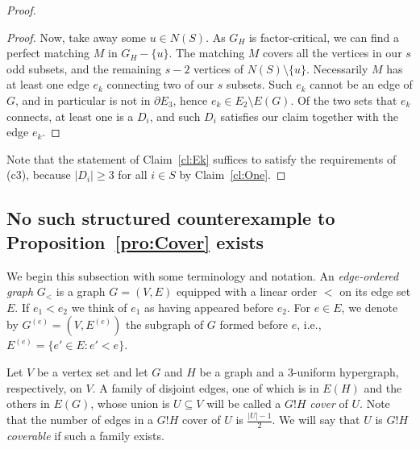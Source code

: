 \documentclass{article}
\theoremstyle{definition}
\begin{document}
\begin{proof}
\begin{proof}
Now, take away some $u \in N(S)$. As $G_H$ is factor-critical, we can find a perfect matching $M$ in $G_H - \{u\}$. The matching $M$ covers all the vertices in our $s$ odd subsets, and the remaining $s-2$ vertices of $N(S) \setminus \{u\}$. Necessarily $M$ has at least one edge $e_k$ connecting two of our $s$ subsets. Such $e_k$ cannot be an edge of $G$, and in particular is not in $\partial E_3$, hence $e_k \in E_2 \setminus E(G)$. Of the two sets that $e_k$ connects, at least one is a $D_i$, and such $D_i$ satisfies our claim together with the edge $e_k$.
\end{proof}

Note that the statement of Claim~\ref{cl:Ek} suffices to satisfy the requirements of (c3), because $|D_i| \ge 3$ for all $i \in S$ by Claim~\ref{cl:One}.
\end{proof}

\subsection{No such structured counterexample to Proposition~\ref{pro:Cover} exists}
We begin this subsection with some terminology and notation. An \emph{edge-ordered graph} $G_<$ is a graph $G = (V, E)$ equipped with a linear order $<$ on its edge set $E$. If $e_1 < e_2$ we think of $e_1$ as having appeared before $e_2$. For $e \in E$, we denote by $G^{(e)} = (V, E^{(e)})$ the subgraph of $G$ formed before $e$, i.e., $E^{(e)} = \{ e' \in E: e' < e\}$.

Let $V$ be a vertex set and let $G$ and $H$ be a graph and a $3$-uniform hypergraph, respectively, on $V$. A family of disjoint edges, one of which is in $E(H)$ and the others in $E(G)$, whose union is $U \subseteq V$ will be called a $G!H$ \emph{cover} of $U$. Note that the number of edges in a $G!H$ cover of $U$ is $\frac{|U|-1}{2}$. We will say that $U$ is $G!H$ \emph{coverable} if such a family exists.
\end{document}
